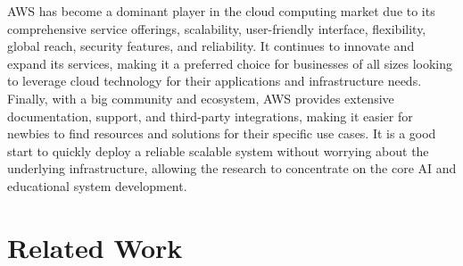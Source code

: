 AWS has become a dominant player in the cloud computing market due to its comprehensive service offerings, scalability, user-friendly interface, flexibility, global reach, security features, and reliability. It continues to innovate and expand its services, making it a preferred choice for businesses of all sizes looking to leverage cloud technology for their applications and infrastructure needs. Finally, with a big community and ecosystem, AWS provides extensive documentation, support, and third-party integrations, making it easier for newbies to find resources and solutions for their specific use cases. It is a good start to quickly deploy a reliable scalable system without worrying about the underlying infrastructure, allowing the research to concentrate on the core AI and educational system development.
\section{Related Work}

